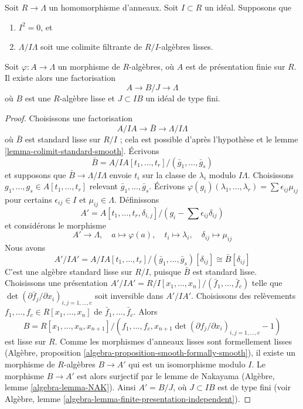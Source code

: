 \begin{lemma}
\label{lemma-lift-once}
Soit $R \to \Lambda$ un homomorphisme d'anneaux. Soit $I \subset R$ un idéal.
Supposons que
\begin{enumerate}
\item $I^2 = 0$, et
\item $\Lambda/I\Lambda$ soit une colimite filtrante de $R/I$-algèbres lisses.
\end{enumerate}
Soit $\varphi : A \to \Lambda$ un morphisme de $R$-algèbres, où $A$ est de
présentation finie sur $R$. Il existe alors une factorisation
$$
A \to B/J \to \Lambda
$$
où $B$ est une $R$-algèbre lisse et $J \subset IB$ un idéal de type fini.
\end{lemma}

\begin{proof}
Choisissons une factorisation
$$
A/IA \to \bar B \to \Lambda/I\Lambda
$$
où $\bar B$ est standard lisse sur $R/I$ ; cela est possible d'après
l'hypothèse et le lemme \ref{lemma-colimit-standard-smooth}. Écrivons
$$
\bar B = A/IA[t_1, \ldots, t_r]/(\bar g_1, \ldots, \bar g_s)
$$
et supposons que $\bar B \to \Lambda/I\Lambda$ envoie $t_i$ sur la classe
de $\lambda_i$ modulo $I\Lambda$. Choisissons
$g_1, \ldots, g_s \in A[t_1, \ldots, t_r]$ relevant
$\bar g_1, \ldots, \bar g_s$. Écrivons
$\varphi(g_i)(\lambda_1, \ldots, \lambda_r) =
\sum \epsilon_{ij} \mu_{ij}$
pour certains $\epsilon_{ij} \in I$ et $\mu_{ij} \in \Lambda$. Définissons
$$
A' = A[t_1, \ldots, t_r, \delta_{i, j}]/
(g_i - \sum \epsilon_{ij} \delta_{ij})
$$
et considérons le morphisme
$$
A' \longrightarrow \Lambda,\quad
a \longmapsto \varphi(a),\quad
t_i \longmapsto \lambda_i,\quad
\delta_{ij} \longmapsto \mu_{ij}
$$
Nous avons
$$
A'/IA' = A/IA[t_1, \ldots, t_r]/(\bar g_1, \ldots, \bar g_s)[\delta_{ij}]
\cong \bar B[\delta_{ij}]
$$
C'est une algèbre standard lisse sur $R/I$, puisque $\bar B$ est standard
lisse. Choisissons une présentation
$A'/IA' = R/I[x_1, \ldots, x_n]/(\bar f_1, \ldots, \bar f_c)$ telle que
$\det(\partial \bar f_j/\partial x_i)_{i, j = 1, \ldots, c}$ soit inversible dans
$A'/IA'$. Choisissons des relèvements $f_1, \ldots, f_c \in R[x_1, \ldots, x_n]$ de
$\bar f_1, \ldots, \bar f_c$. Alors
$$
B = R[x_1, \ldots, x_n, x_{n + 1}]/
(f_1, \ldots, f_c,
x_{n + 1}\det(\partial f_j/\partial x_i)_{i, j = 1, \ldots, c} - 1)
$$
est lisse sur $R$. Comme les morphismes d'anneaux lisses sont formellement lisses
(Algèbre, proposition \ref{algebra-proposition-smooth-formally-smooth}),
il existe un morphisme de $R$-algèbres $B \to A'$ qui est un isomorphisme
modulo $I$. Le morphisme $B \to A'$ est alors surjectif par le lemme de Nakayama
(Algèbre, lemme \ref{algebra-lemma-NAK}).
Ainsi $A' = B/J$, où $J \subset IB$ est de type fini (voir
Algèbre, lemme \ref{algebra-lemma-finite-presentation-independent}).
\end{proof}

